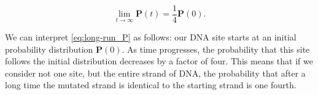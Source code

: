 \documentclass{article}
\begin{document}
		\begin{equation}
			\lim\limits_{t\rightarrow\infty}\mathbf{P}(t) = \frac{1}{4}\mathbf{P}(0).
			\label{eq:long-run_P}
		\end{equation}
		
		We can interpret \eqref{eq:long-run_P} as follows: our DNA site starts at an initial probability distribution $\mathbf{P}(0)$. As time progresses, the probability that this site follows the initial distribution decreases by a factor of four. This means that if we consider not one site, but the entire strand of DNA, the probability that after a long time the mutated strand is identical to the starting strand is one fourth. 
\end{document}
